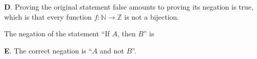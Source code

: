 \documentclass[addpoints]{exam}
\begin{document}
\begin{questions}

	\begin{solution}
		\textbf{D}. Proving the original statement false amounts to proving its negation is true, which is that every function $f: \mathbb{N} \to \mathbb{Z}$ is not a bijection. 
	\end{solution}

\question[2] The negation of the statement ``If $A$, then $B$'' is

		\begin{solution}
			\textbf{E}. The correct negation is ``$A$ and not $B$''.
		\end{solution}




\end{questions}
\end{document}
